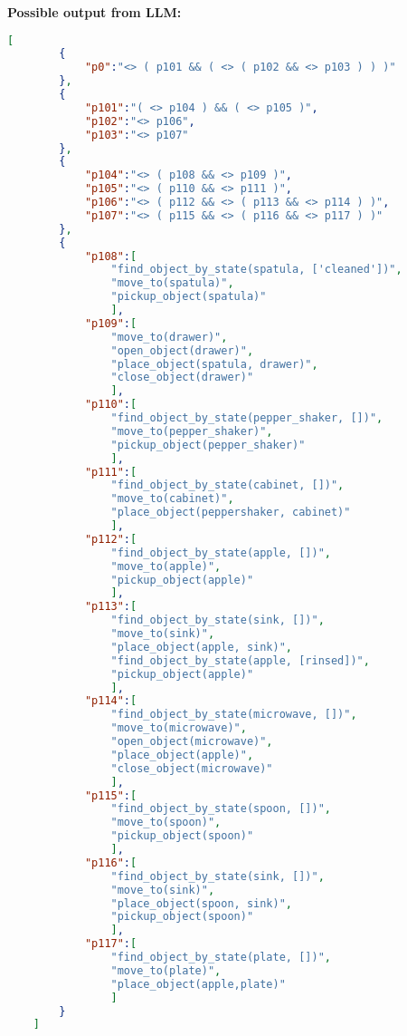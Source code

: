 \documentclass{article}
\begin{document}
    \textbf{Possible output from LLM:}
    \begin{lstlisting}[language=json]
    [
        {
            "p0":"<> ( p101 && ( <> ( p102 && <> p103 ) ) )"
        },
        {
            "p101":"( <> p104 ) && ( <> p105 )",
            "p102":"<> p106",
            "p103":"<> p107"
        },
        {
            "p104":"<> ( p108 && <> p109 )",
            "p105":"<> ( p110 && <> p111 )",
            "p106":"<> ( p112 && <> ( p113 && <> p114 ) )",
            "p107":"<> ( p115 && <> ( p116 && <> p117 ) )"
        },
        {
            "p108":[
                "find_object_by_state(spatula, ['cleaned'])",
                "move_to(spatula)",
                "pickup_object(spatula)"
                ], 
            "p109":[
                "move_to(drawer)",
                "open_object(drawer)",
                "place_object(spatula, drawer)",
                "close_object(drawer)"
                ],
            "p110":[
                "find_object_by_state(pepper_shaker, [])",
                "move_to(pepper_shaker)",
                "pickup_object(pepper_shaker)"
                ],
            "p111":[
                "find_object_by_state(cabinet, [])",
                "move_to(cabinet)",
                "place_object(peppershaker, cabinet)"
                ],
            "p112":[
                "find_object_by_state(apple, [])",
                "move_to(apple)",
                "pickup_object(apple)"
                ],
            "p113":[
                "find_object_by_state(sink, [])",
                "move_to(sink)",
                "place_object(apple, sink)",
                "find_object_by_state(apple, [rinsed])",
                "pickup_object(apple)"
                ],
            "p114":[
                "find_object_by_state(microwave, [])",
                "move_to(microwave)",
                "open_object(microwave)",
                "place_object(apple)",
                "close_object(microwave)"
                ],
            "p115":[
                "find_object_by_state(spoon, [])",
                "move_to(spoon)",
                "pickup_object(spoon)"
                ],
            "p116":[
                "find_object_by_state(sink, [])",
                "move_to(sink)",
                "place_object(spoon, sink)",
                "pickup_object(spoon)"
                ],
            "p117":[
                "find_object_by_state(plate, [])",
                "move_to(plate)",
                "place_object(apple,plate)"
                ]
        }
    ]
    \end{lstlisting}
    
\end{document}
